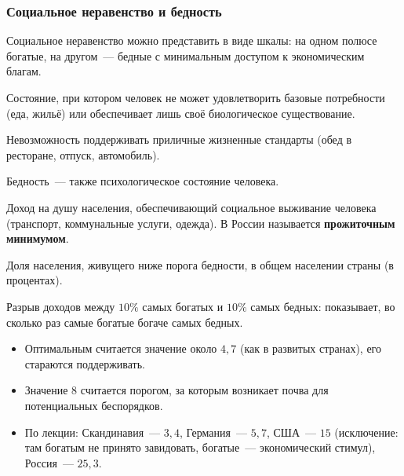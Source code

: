 \documentclass[12pt]{article}
\begin{document}
	\subsubsection{Социальное неравенство и бедность}

	Социальное неравенство можно представить в виде шкалы: на одном полюсе богатые, на другом~--- бедные с минимальным доступом к экономическим благам.

	\begin{definition}
		Состояние, при котором человек не может удовлетворить базовые потребности (еда, жильё) или обеспечивает лишь своё биологическое существование.
	\end{definition}

	\begin{definition}
		Невозможность поддерживать приличные жизненные стандарты (обед в ресторане, отпуск, автомобиль).
	\end{definition}

	\begin{note}
		Бедность~--- также психологическое состояние человека.
	\end{note}

	\begin{definition}
		Доход на душу населения, обеспечивающий социальное выживание человека (транспорт, коммунальные услуги, одежда). В России называется \textbf{прожиточным минимумом}.
	\end{definition}

	\begin{definition}
		Доля населения, живущего ниже порога бедности, в общем населении страны (в процентах).
	\end{definition}

	\begin{definition}
		Разрыв доходов между $10\%$ самых богатых и $10\%$ самых бедных: показывает, во сколько раз самые богатые богаче самых бедных.
	\end{definition}

	\begin{itemize}
		\item Оптимальным считается значение около $4{,}7$ (как в развитых странах), его стараются поддерживать.
		\item Значение $8$ считается порогом, за которым возникает почва для потенциальных беспорядков.
		\item По лекции: Скандинавия~--- $3{,}4$, Германия~--- $5{,}7$, США~--- $15$ (исключение: там богатым не принято завидовать, богатые~--- экономический стимул), Россия~--- $25{,}3$.
	\end{itemize}
\end{document}
